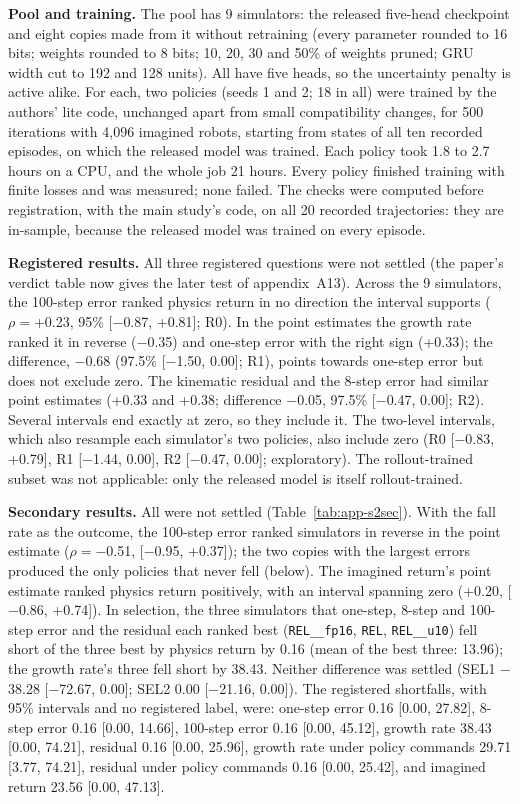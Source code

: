 \textbf{Pool and training.} The pool has 9 simulators: the released five-head checkpoint and eight copies
made from it without retraining (every parameter rounded to 16 bits; weights rounded to 8 bits; 10, 20, 30 and 50\%
of weights pruned; GRU width cut to 192 and 128 units). All have five heads, so the uncertainty penalty is active
alike. For each, two policies (seeds 1 and 2; 18 in all) were trained by the authors' lite code,
unchanged apart from small compatibility changes, for 500 iterations with 4{,}096 imagined robots,
starting from states of all ten recorded episodes, on which the released model was trained. Each policy took
1.8 to 2.7 hours on a CPU, and the whole job 21 hours. Every policy
finished training with finite losses and was measured; none failed. The checks were computed before registration, with
the main study's code, on all 20 recorded trajectories: they are in-sample, because the released model was trained
on every episode.

\textbf{Registered results.} All three registered questions were not settled (the paper's verdict table now gives the later test of appendix~A13). Across the
9 simulators, the 100-step error ranked physics return in no direction the interval supports ($\rho={}$+0.23, 95\%
[$-$0.87, +0.81]; R0). In the point estimates the growth rate ranked it in reverse ($-$0.35) and one-step error with the right
sign (+0.33); the difference, $-$0.68 (97.5\% [$-$1.50, 0.00]; R1), points towards one-step error but
does not exclude zero. The kinematic residual and the 8-step error had similar point estimates (+0.33 and
+0.38; difference $-$0.05, 97.5\% [$-$0.47, 0.00]; R2). Several intervals end exactly at zero, so they include it. The two-level intervals, which also
resample each simulator's two policies, also include zero (R0 [$-$0.83, +0.79], R1 [$-$1.44, 0.00], R2
[$-$0.47, 0.00]; exploratory). The rollout-trained subset was not applicable: only the released model is itself
rollout-trained.

\textbf{Secondary results.} All were not settled (Table~\ref{tab:app-s2sec}). With the fall rate as the outcome, the
100-step error ranked simulators in reverse in the point estimate ($\rho={}$$-$0.51, [$-$0.95, +0.37]); the two copies with the
largest errors produced the only policies that never fell (below). The imagined return's point estimate ranked physics return
positively, with an interval spanning zero (+0.20, [$-$0.86, +0.74]). In selection, the three simulators that one-step, 8-step and 100-step
error and the residual each ranked best (\texttt{REL\_\_fp16}, \texttt{REL}, \texttt{REL\_\_u10}) fell short of the three best by physics return by
0.16 (mean of the best three: 13.96); the growth rate's three fell short by 38.43. Neither
difference was settled (SEL1 $-$38.28 [$-$72.67, 0.00]; SEL2 0.00 [$-$21.16, 0.00]). The registered shortfalls,
with 95\% intervals and no registered label, were: one-step error 0.16 [0.00, 27.82], 8-step error 0.16
[0.00, 14.66], 100-step error 0.16 [0.00, 45.12], growth rate 38.43 [0.00, 74.21], residual
0.16 [0.00, 25.96], growth rate under policy commands 29.71 [3.77, 74.21], residual under
policy commands 0.16 [0.00, 25.42], and imagined return 23.56 [0.00, 47.13].

